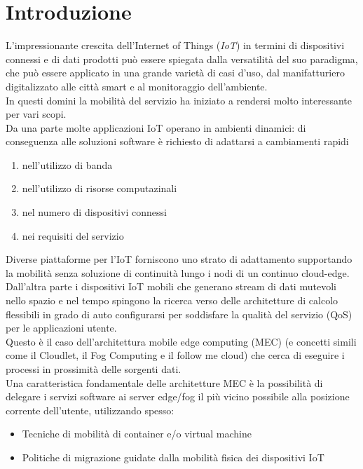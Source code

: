 \documentclass[11pt]{article}
\begin{document}
	\pagebreak
	
	\section{Introduzione}



	L'impressionante crescita dell'Internet of Things (\textit{IoT}) in termini di dispositivi connessi e di dati prodotti può essere spiegata dalla versatilità del suo paradigma, che può essere applicato in una grande varietà di casi d'uso, dal manifatturiero digitalizzato alle città smart e al monitoraggio dell'ambiente. \\
	
	In questi domini la mobilità del servizio ha iniziato a rendersi molto interessante per vari scopi. \\
	
	Da una parte molte applicazioni IoT operano in ambienti dinamici: di conseguenza alle soluzioni software è richiesto di adattarsi a cambiamenti rapidi
	\begin{enumerate}
		\item nell'utilizzo di banda
		\item nell'utilizzo di risorse computazinali
		\item nel numero di dispositivi connessi
		\item nei requisiti del servizio
	\end{enumerate}
 	Diverse piattaforme per l'IoT forniscono uno strato di adattamento supportando la mobilità senza soluzione di continuità lungo i nodi di un continuo cloud-edge.
 	\\
 	
 	Dall'altra parte i dispositivi IoT mobili che generano stream di dati mutevoli nello spazio e nel tempo spingono la ricerca verso delle architetture di calcolo flessibili in grado di auto configurarsi per soddisfare la qualità del servizio (QoS) per le applicazioni utente.
 	\\
 	
 	Questo è il caso dell'architettura mobile edge computing (MEC)  (e concetti simili come il Cloudlet, il Fog Computing e il follow me cloud) che cerca di eseguire i processi in prossimità delle sorgenti dati.
 	\\
 	Una caratteristica fondamentale delle architetture MEC è la possibilità di delegare i servizi software ai server edge/fog il più vicino possibile alla posizione corrente dell'utente, utilizzando spesso:
 	\begin{itemize}
 		\item Tecniche di mobilità di container e/o virtual machine
 		\item Politiche di migrazione guidate dalla mobilità fisica dei dispositivi IoT
 	\end{itemize}
  
\end{document}
